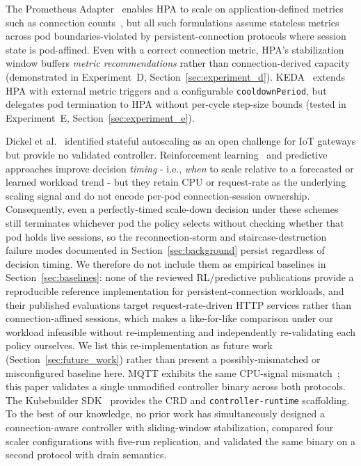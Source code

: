 \documentclass[3p,twocolumn]{elsarticle}
\theoremstyle{plain}%
\theoremstyle{definition}%
\begin{document}
The Prometheus Adapter~\cite{prometheus_adapter} enables HPA to scale on application-defined metrics such as connection counts~\cite{qu2018auto,rossi2020horizontal}, but all such formulations assume stateless metrics across pod boundaries-violated by persistent-connection protocols where session state is pod-affined. Even with a correct connection metric, HPA's stabilization window buffers \emph{metric recommendations} rather than connection-derived capacity (demonstrated in Experiment~D, Section~\ref{sec:experiment_d}). KEDA~\cite{keda_docs} extends HPA with external metric triggers and a configurable \texttt{cooldownPeriod}, but delegates pod termination to HPA without per-cycle step-size bounds (tested in Experiment~E, Section~\ref{sec:experiment_e}).

Dickel et al.~\cite{dickel2019stateful} identified stateful autoscaling as an open challenge for IoT gateways but provide no validated controller. Reinforcement learning~\cite{rossi2020horizontal,imdoukh2020machine} and predictive~\cite{toka2021machine,zhong2020machine} approaches improve decision \emph{timing} - i.e., \textit{when} to scale relative to a forecasted or learned workload trend - but they retain CPU or request-rate as the underlying scaling signal and do not encode per-pod connection-session ownership. Consequently, even a perfectly-timed scale-down decision under these schemes still terminates whichever pod the policy selects without checking whether that pod holds live sessions, so the reconnection-storm and staircase-destruction failure modes documented in Section~\ref{sec:background} persist regardless of decision timing. We therefore do not include them as empirical baselines in Section~\ref{sec:baselines}: none of the reviewed RL/predictive publications provide a reproducible reference implementation for persistent-connection workloads, and their published evaluations target request-rate-driven HTTP services rather than connection-affined sessions, which makes a like-for-like comparison under our workload infeasible without re-implementing and independently re-validating each policy ourselves. We list this re-implementation as future work (Section~\ref{sec:future_work}) rather than present a possibly-mismatched or misconfigured baseline here. MQTT exhibits the same CPU-signal mismatch~\cite{soni2017mqtt,mqtt_v31}; this paper validates a single unmodified controller binary across both protocols. The Kubebuilder SDK~\cite{kubebuilder_docs} provides the CRD and \texttt{controller-runtime} scaffolding. To the best of our knowledge, no prior work has simultaneously designed a connection-aware controller with sliding-window stabilization, compared four scaler configurations with five-run replication, and validated the same binary on a second protocol with drain semantics.
\end{document}
